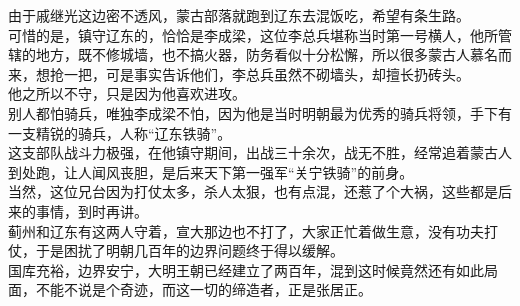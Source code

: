 \begin{multicols}{\theparacolNo}
由于戚继光这边密不透风，蒙古部落就跑到辽东去混饭吃，希望有条生路。\\

可惜的是，镇守辽东的，恰恰是李成梁，这位李总兵堪称当时第一号横人，他所管辖的地方，既不修城墙，也不搞火器，防务看似十分松懈，所以很多蒙古人慕名而来，想抢一把，可是事实告诉他们，李总兵虽然不砌墙头，却擅长扔砖头。\\

他之所以不守，只是因为他喜欢进攻。\\

别人都怕骑兵，唯独李成梁不怕，因为他是当时明朝最为优秀的骑兵将领，手下有一支精锐的骑兵，人称“辽东铁骑”。\\

这支部队战斗力极强，在他镇守期间，出战三十余次，战无不胜，经常追着蒙古人到处跑，让人闻风丧胆，是后来天下第一强军“关宁铁骑”的前身。\\

当然，这位兄台因为打仗太多，杀人太狠，也有点混，还惹了个大祸，这些都是后来的事情，到时再讲。\\

蓟州和辽东有这两人守着，宣大那边也不打了，大家正忙着做生意，没有功夫打仗，于是困扰了明朝几百年的边界问题终于得以缓解。\\

国库充裕，边界安宁，大明王朝已经建立了两百年，混到这时候竟然还有如此局面，不能不说是个奇迹，而这一切的缔造者，正是张居正。\\
\ifnum{}
	\end{multicols}
\fi
\newpage

